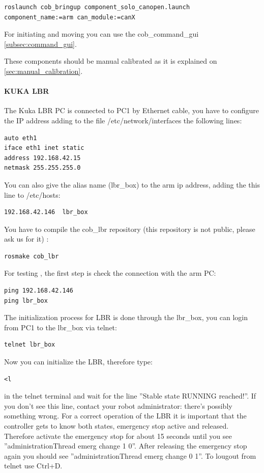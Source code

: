 \begin{lstlisting}
roslaunch cob_bringup component_solo_canopen.launch component_name:=arm can_module:=canX
\end{lstlisting}

For initiating and moving you can use the cob\_command\_gui \ref{subsec:command_gui}.

These components should be manual calibrated as it is explained on \ref{sec:manual_calibration}.

\paragraph{KUKA LBR}
The Kuka LBR PC is connected to PC1 by Ethernet cable, you have to configure the IP address adding to the file /etc/network/interfaces the following lines:
\begin{lstlisting}
auto eth1
iface eth1 inet static
address 192.168.42.15
netmask 255.255.255.0
\end{lstlisting}

You can also give the alias name (lbr\_box) to the arm ip address, adding the this line to /etc/hosts:
\begin{lstlisting}
192.168.42.146  lbr_box
\end{lstlisting}

You have to compile the cob\_lbr repository (this repository is not public, please ask us for it) :
\begin{lstlisting}
rosmake cob_lbr
\end{lstlisting}

For testing , the first step is check the connection with the arm PC:
\begin{lstlisting}
ping 192.168.42.146
ping lbr_box
\end{lstlisting}

The initialization process for LBR is done through the lbr\_box, you can login from PC1 to the lbr\_box via telnet:
\begin{lstlisting}
telnet lbr_box
\end{lstlisting}

Now you can initialize the LBR, therefore type: 
\begin{lstlisting}
<l
\end{lstlisting}

in the telnet terminal and wait for the line ”Stable state RUNNING reached!”. If you don’t see this line, contact your robot administrator: there’s possibly something wrong.
For a correct operation of the LBR it is important that the controller gets to know both states, emergency stop active and released. Therefore activate the emergency stop for about 15 seconds until you see ”administrationThread emerg change 1 0”. After releasing the emergency stop again you should see ”administrationThread emerg change 0 1”.
To lougout from telnet use Ctrl+D.

